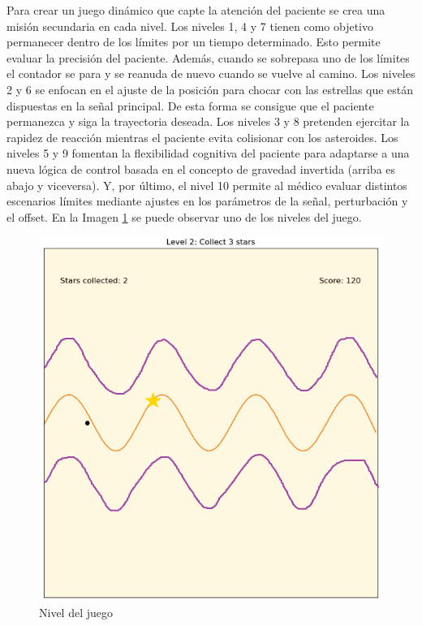 Para crear un juego dinámico que capte la atención del paciente se crea una misión secundaria en cada nivel.
Los niveles 1, 4 y 7 tienen como objetivo permanecer dentro de los límites por un tiempo determinado.
Esto permite evaluar la precisión del paciente.
Además, cuando se sobrepasa uno de los límites el contador se para y se reanuda de nuevo cuando se vuelve al camino.
Los niveles 2 y 6 se enfocan en el ajuste de la posición para chocar con las estrellas que están dispuestas en la señal principal.
De esta forma se consigue que el paciente permanezca y siga la trayectoria deseada.
Los niveles 3 y 8 pretenden ejercitar la rapidez de reacción mientras el paciente evita colisionar con los asteroides.
Los niveles 5 y 9 fomentan la flexibilidad cognitiva del paciente para adaptarse a una nueva lógica de control basada en el concepto de gravedad invertida (arriba es abajo y viceversa).
Y, por último, el nivel 10 permite al médico evaluar distintos escenarios límites mediante ajustes en los parámetros de la señal, perturbación y el offset.
En la Imagen \ref{fig:level} se puede observar uno de los niveles del juego.

\begin{figure}[ht!]
	\centering
	\begin{minipage}{0.90\linewidth}
		\centering
		\includegraphics[width=\linewidth]{figs/flappy_level2.png}
	\end{minipage}
	\caption[Nivel del juego]{Nivel del juego}
	\label{fig:level}
\end{figure}

